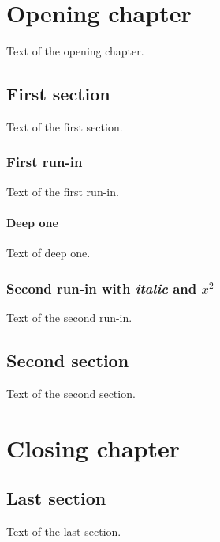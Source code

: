 \documentclass{report}
\begin{document}
\tableofcontents
\chapter{Opening chapter}
Text of the opening chapter.
\section{First section}
Text of the first section.
\subsection{First run-in}
Text of the first run-in.
\subsubsection{Deep one}
Text of deep one.
\subsection{Second run-in with \emph{italic} and $x^2$}
Text of the second run-in.
\section{Second section}
Text of the second section.
\chapter{Closing chapter}
\section{Last section}
Text of the last section.
\end{document}
